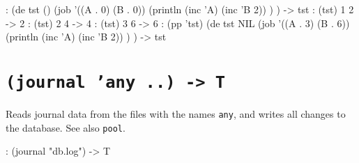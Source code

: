 \begin{wideverbatim}
: (de tst ()
   (job '((A . 0) (B . 0))
      (println (inc 'A) (inc 'B 2)) ) )
-> tst
: (tst)
1 2
-> 2
: (tst)
2 4
-> 4
: (tst)
3 6
-> 6
: (pp 'tst)
(de tst NIL
   (job '((A . 3) (B . 6))
      (println (inc 'A) (inc 'B 2)) ) )
-> tst
\end{wideverbatim}

 
\section*{\texttt{(journal 'any ..) -> T}}
\label{sec:func-ref-J-(journal 'any ..) -> T}


Reads journal data from the files with the names \texttt{any}, and writes all
changes to the database. See also \texttt{pool}.


\begin{wideverbatim}
: (journal "db.log")
-> T
\end{wideverbatim}


